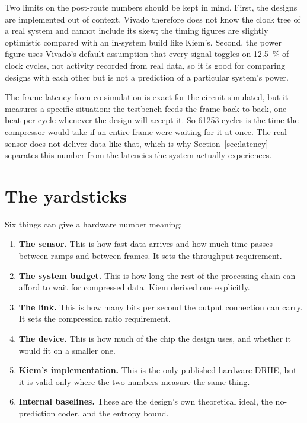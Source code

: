 Two limits on the post-route numbers should be kept in mind. First, the designs
are implemented out of context. Vivado therefore does not know the clock tree
of a real system and cannot include its skew; the timing figures are slightly
optimistic compared with an in-system build like Kiem's. Second, the power
figure uses Vivado's default assumption that every signal toggles on
\SI{12.5}{\percent} of clock cycles, not activity recorded from real data, so it
is good for comparing designs with each other but is not a prediction of a
particular system's power.

The frame latency from co-simulation is exact for the circuit simulated, but it
measures a specific situation: the testbench feeds the frame back-to-back, one
beat per cycle whenever the design will accept it. So \num{61253} cycles is the
time the compressor would take if an entire frame were waiting for it at once.
The real sensor does not deliver data like that, which is why
Section~\ref{sec:latency} separates this number from the latencies the system
actually experiences.

\section{The yardsticks}
\label{sec:yardsticks}

Six things can give a hardware number meaning:

\begin{enumerate}
\item \textbf{The sensor.} This is how fast data arrives and how much time
passes between ramps and between frames. It sets the throughput requirement.
\item \textbf{The system budget.} This is how long the rest of the processing
chain can afford to wait for compressed data. Kiem derived one explicitly.
\item \textbf{The link.} This is how many bits per second the output
connection can carry. It sets the compression ratio requirement.
\item \textbf{The device.} This is how much of the chip the design uses, and
whether it would fit on a smaller one.
\item \textbf{Kiem's implementation.} This is the only published hardware
DRHE, but it is valid only where the two numbers measure the same thing.
\item \textbf{Internal baselines.} These are the design's own theoretical ideal,
the no-prediction coder, and the entropy bound.
\end{enumerate}

